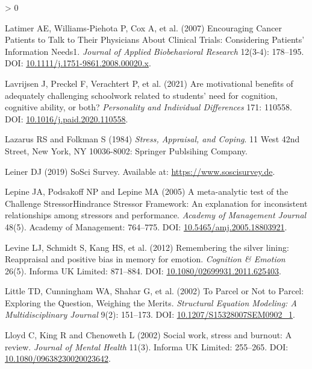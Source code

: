 \documentclass[
  english,
  man,floatsintext]{apa6}
\newlength{\cslhangindent}
\newenvironment{CSLReferences}[2] %
 {%
  \setlength{\parindent}{0pt}
  \ifodd #1 \everypar{\setlength{\hangindent}{\cslhangindent}}\ignorespaces\fi
  \ifnum #2 > 0
  \setlength{\parskip}{#2\baselineskip}
  \fi
 }%
 {}
\begin{document}
\begin{CSLReferences}{1}{0}
\leavevmode\hypertarget{ref-Latimer2007}{}%
Latimer AE, Williams‐Piehota P, Cox A, et al. (2007) Encouraging {Cancer} {Patients} to {Talk} to {Their} {Physicians} {About} {Clinical} {Trials}: {Considering} {Patients}' {Information} {Needs1}. \emph{Journal of Applied Biobehavioral Research} 12(3-4): 178--195. DOI: \href{https://doi.org/10.1111/j.1751-9861.2008.00020.x}{10.1111/j.1751-9861.2008.00020.x}.

\leavevmode\hypertarget{ref-Lavrijsen2021}{}%
Lavrijsen J, Preckel F, Verachtert P, et al. (2021) Are motivational benefits of adequately challenging schoolwork related to students' need for cognition, cognitive ability, or both? \emph{Personality and Individual Differences} 171: 110558. DOI: \href{https://doi.org/10.1016/j.paid.2020.110558}{10.1016/j.paid.2020.110558}.

\leavevmode\hypertarget{ref-Lazarus1984}{}%
Lazarus RS and Folkman S (1984) \emph{Stress, {Appraisal}, and {Coping}}. 11 West 42nd Street, New York, NY 10036-8002: Springer Publsihing Company.

\leavevmode\hypertarget{ref-Leiner2019}{}%
Leiner DJ (2019) {SoSci} {Survey}. Available at: \url{https://www.soscisurvey.de}.

\leavevmode\hypertarget{ref-Lepine2005}{}%
Lepine JA, Podsakoff NP and Lepine MA (2005) A meta-analytic test of the {C}hallenge {S}tressor{{}}{H}indrance {S}tressor {F}ramework: {A}n explanation for inconsistent relationships among stressors and performance. \emph{Academy of Management Journal} 48(5). Academy of Management: 764--775. DOI: \href{https://doi.org/10.5465/amj.2005.18803921}{10.5465/amj.2005.18803921}.

\leavevmode\hypertarget{ref-Levine2012}{}%
Levine LJ, Schmidt S, Kang HS, et al. (2012) Remembering the silver lining: Reappraisal and positive bias in memory for emotion. \emph{Cognition {\&} Emotion} 26(5). Informa {UK} Limited: 871--884. DOI: \href{https://doi.org/10.1080/02699931.2011.625403}{10.1080/02699931.2011.625403}.

\leavevmode\hypertarget{ref-Little2002}{}%
Little TD, Cunningham WA, Shahar G, et al. (2002) To {Parcel} or {Not} to {Parcel}: {Exploring} the {Question}, {Weighing} the {Merits}. \emph{Structural Equation Modeling: A Multidisciplinary Journal} 9(2): 151--173. DOI: \href{https://doi.org/10.1207/S15328007SEM0902_1}{10.1207/S15328007SEM0902\_1}.

\leavevmode\hypertarget{ref-Lloyd2002}{}%
Lloyd C, King R and Chenoweth L (2002) Social work, stress and burnout: A review. \emph{Journal of Mental Health} 11(3). Informa {UK} Limited: 255--265. DOI: \href{https://doi.org/10.1080/09638230020023642}{10.1080/09638230020023642}.


\end{CSLReferences}
\end{document}

